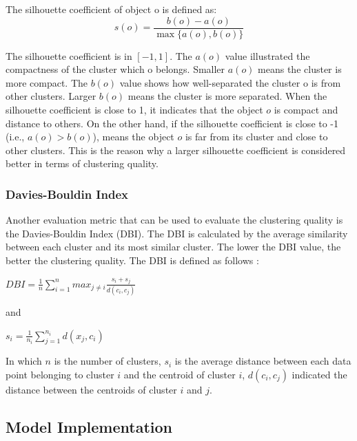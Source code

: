 \documentclass[12pt]{article}
\begin{document}
The silhouette coefficient of object o is defined as:
$$s(o) = \frac{b(o) - a(o)}{\max\{a(o),b(o)\}}$$

\noindent The silhouette coefficient is in $[-1,1]$. The $a(o)$ value illustrated
the compactness of the cluster which o belongs. Smaller $a(o)$ means the
cluster is more compact. The $b(o)$ value shows how well-separated the 
cluster o is from other clusters. Larger $b(o)$ means the cluster is
more separated. When the silhouette coefficient is close to 1, it indicates
that the object $o$ is compact and distance to others. On the other hand, 
if the silhouette coefficient is close to -1 (i.e., $a(o) > b(o)$), means
the object $o$ is far from its cluster and close to other clusters. This is
the reason why a larger silhouette coefficient is considered better in terms of
clustering quality. 


\subsubsection{Davies-Bouldin Index}

\noindent Another evaluation metric that can be used to evaluate
the clustering quality is the Davies-Bouldin Index (DBI). The DBI
is calculated by the average similarity between each cluster and its
most similar cluster. The lower the DBI value, the better the clustering
quality. The DBI is defined as follows \citep{HOSEN2023688}:
\begin{center}

$ DBI = \frac{1}{n} \sum_{i=1}^{n} max_{j \neq i} \frac{s_i + s_j}{d(c_i,c_j)}$

\end{center}
and
\begin{center}
$s_i = \frac{1}{n_i} \sum_{j=1}^{n_i} d(x_j,c_i)$
\end{center}
\noindent In which $n$ is the number of clusters, $s_i$ is the average distance between
each data point belonging to cluster $i$ and the centroid of cluster $i$, 
$d(c_i,c_j)$ indicated the distance between the centroids of cluster $i$ and
$j$.

\subsection{Model Implementation}
\end{document}
